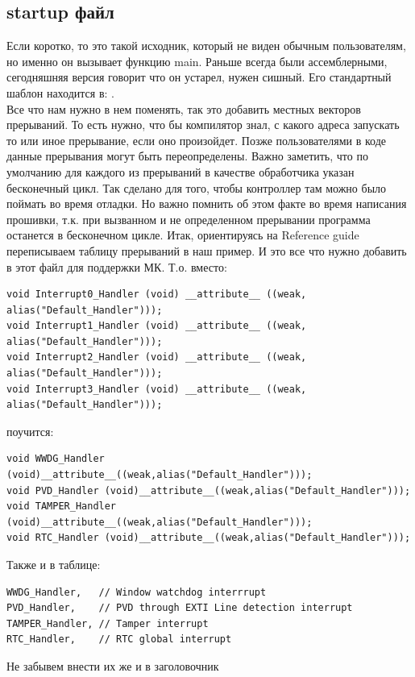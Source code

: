 \documentclass[12pt,a4paper]{article}
\begin{document}
\subsection{startup файл}
    Если коротко, то это такой исходник, который не виден обычным пользователям,
    но именно он вызывает функцию main. Раньше всегда были ассемблерными,
    сегодняшняя версия говорит что он устарел, нужен сишный. Его стандартный
    шаблон находится в:
    .\\
    Все что нам нужно в нем поменять, так это добавить местных векторов
    прерываний. То есть нужно, что бы компилятор знал, с какого адреса запускать
    то или иное прерывание, если оно произойдет. Позже пользователями в коде
    данные прерывания могут быть переопределены. Важно заметить, что по
    умолчанию для каждого из прерываний в качестве обработчика указан
    бесконечный цикл. Так сделано для того, чтобы контроллер там можно было
    поймать во время отладки. Но важно помнить об этом факте во время
    написания прошивки, т.к. при вызванном и не определенном прерывании
    программа останется в бесконечном цикле. Итак, ориентируясь на Reference
    guide переписываем таблицу прерываний в наш пример. И это все что нужно
    добавить в этот файл для поддержки МК. Т.о. вместо:
\begin{lstlisting}
void Interrupt0_Handler (void) __attribute__ ((weak, alias("Default_Handler")));
void Interrupt1_Handler (void) __attribute__ ((weak, alias("Default_Handler")));
void Interrupt2_Handler (void) __attribute__ ((weak, alias("Default_Handler")));
void Interrupt3_Handler (void) __attribute__ ((weak, alias("Default_Handler")));
\end{lstlisting}
    поучится:
\begin{lstlisting}
void WWDG_Handler (void)__attribute__((weak,alias("Default_Handler")));
void PVD_Handler (void)__attribute__((weak,alias("Default_Handler")));
void TAMPER_Handler (void)__attribute__((weak,alias("Default_Handler")));
void RTC_Handler (void)__attribute__((weak,alias("Default_Handler")));
\end{lstlisting}
    Также и в таблице:
\begin{lstlisting}
WWDG_Handler,   // Window watchdog interrrupt
PVD_Handler,    // PVD through EXTI Line detection interrupt
TAMPER_Handler, // Tamper interrupt
RTC_Handler,    // RTC global interrupt
\end{lstlisting}
    Не забывем внести их же и в заголовочник\\
\end{document}

